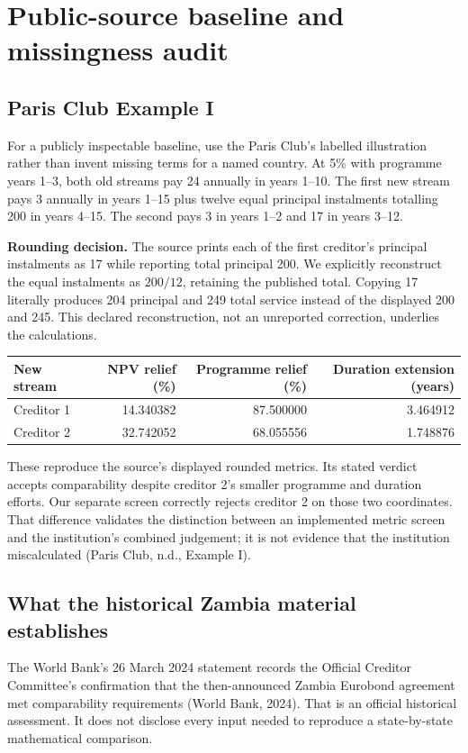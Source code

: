 \documentclass[11pt,a4paper]{article}
\begin{document}
\section{Public-source baseline and missingness audit}\label{sec:benchmark}
\subsection{Paris Club Example I}
For a publicly inspectable baseline, use the Paris Club's labelled illustration rather than invent missing terms for a named country. At 5\% with programme years 1--3, both old streams pay 24 annually in years 1--10. The first new stream pays 3 annually in years 1--15 plus twelve equal principal instalments totalling 200 in years 4--15. The second pays 3 in years 1--2 and 17 in years 3--12.

\textbf{Rounding decision.} The source prints each of the first creditor's principal instalments as 17 while reporting total principal 200. We explicitly reconstruct the equal instalments as $200/12$, retaining the published total. Copying 17 literally produces 204 principal and 249 total service instead of the displayed 200 and 245. This declared reconstruction, not an unreported correction, underlies the calculations.

\begin{center}\small
\begin{tabular}{lrrr}\toprule
New stream & NPV relief (\%) & Programme relief (\%) & Duration extension (years)\\\midrule
Creditor 1 &14.340382&87.500000&3.464912\\
Creditor 2 &32.742052&68.055556&1.748876\\\bottomrule
\end{tabular}
\end{center}
These reproduce the source's displayed rounded metrics. Its stated verdict accepts comparability despite creditor 2's smaller programme and duration efforts. Our separate screen correctly rejects creditor 2 on those two coordinates. That difference validates the distinction between an implemented metric screen and the institution's combined judgement; it is not evidence that the institution miscalculated (Paris Club, n.d., Example I).

\subsection{What the historical Zambia material establishes}
The World Bank's 26 March 2024 statement records the Official Creditor Committee's confirmation that the then-announced Zambia Eurobond agreement met comparability requirements (World Bank, 2024). That is an official historical assessment. It does not disclose every input needed to reproduce a state-by-state mathematical comparison.
\end{document}
